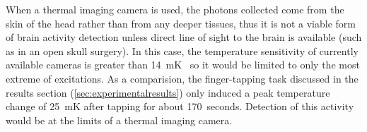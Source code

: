 When a thermal imaging camera is used, the photons collected come from the skin of the head rather than from any deeper tissues, thus it is not a viable form of brain activity detection unless direct line of sight to the brain is available (such as in an open skull surgery).  In this case, the temperature sensitivity of currently available cameras is greater than 14~mK~\citep{flir,ici} so it would be limited to only the most extreme of excitations.  As a comparision, the finger-tapping task discussed in the results section (\cref{sec:experimentalresults}) only induced a peak temperature change of 25~mK after tapping for about 170~seconds.  Detection of this activity would be at the limits of a thermal imaging camera.